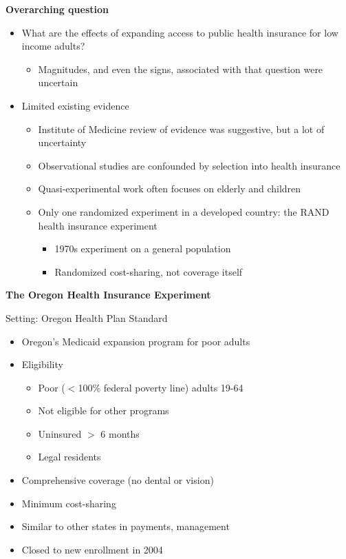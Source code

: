 \documentclass[notes=show]{beamer}
\begin{document}
\begin{frame}[plain]
	\begin{center}
	\textbf{Overarching question}
	\end{center}
	
	\begin{itemize}
	\item What are the effects of expanding access to public health insurance for low income adults?
		\begin{itemize}
		\item Magnitudes, and even the signs, associated with that question were uncertain
		\end{itemize}
	\item Limited existing evidence
		\begin{itemize}
		\item Institute of Medicine review of evidence was suggestive, but a lot of uncertainty
		\item Observational studies are confounded by selection into health insurance
		\item Quasi-experimental work often focuses on elderly and children
		\item Only one randomized experiment in a developed country: the RAND health insurance experiment
			\begin{itemize}
			\item 1970s experiment on a general population
			\item Randomized cost-sharing, not coverage itself
			\end{itemize}
		\end{itemize}
	\end{itemize}
\end{frame}



\begin{frame}[plain]
	\begin{center}
	\textbf{The Oregon Health Insurance Experiment}
	\end{center}
	
	 Setting: Oregon Health Plan Standard
		\begin{itemize}
		\item Oregon's Medicaid expansion program for poor adults
		\item Eligibility
			\begin{itemize}
			\item Poor ($<$100\% federal poverty line) adults 19-64
			\item Not eligible for other programs
			\item Uninsured $>$ 6 months
			\item Legal residents
			\end{itemize}
		\item Comprehensive coverage (no dental or vision)
		\item Minimum cost-sharing
		\item Similar to other states in payments, management 
		\item Closed to new enrollment in 2004
		\end{itemize}
\end{frame}
\end{document}
